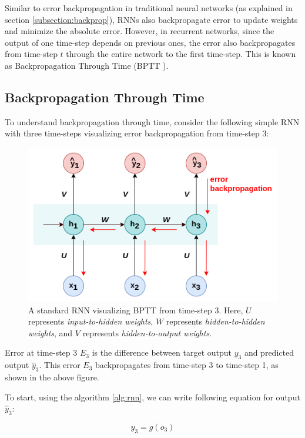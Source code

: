 Similar to error backpropagation in traditional neural networks (as explained in section \ref{subsection:backprop}), RNNs also backpropagate error to update weights and minimize the absolute error. However, in recurrent networks, since the output of one time-step depends on previous ones, the error also backpropagates from time-step $t$ through the entire network to the first time-step. This is known as Backpropagation Through Time (BPTT \cite{bptt-1}).

\subsection{Backpropagation Through Time}\label{subsection:bptt}

To understand backpropagation through time, consider the following simple RNN with three time-steps visualizing error backpropagation from time-step 3:

\begin{figure}[h]
    \centering
    \includegraphics[width=0.7\linewidth]{images/background/bptt.png}
    \caption[Backpropagation Through Time]{A standard RNN visualizing BPTT from time-step 3. Here, $U$ represents \textit{input-to-hidden weights}, $W$ represents \textit{hidden-to-hidden weights}, and $V$ represents \textit{hidden-to-output weights}.}
    \label{fig:bptt}
\end{figure}

Error at time-step 3 $E_3$ is the difference between target output $y_3$  and predicted output $\hat{y}_3$. This error $E_3$ backpropagates from time-step 3 to time-step 1, as shown in the above figure. 

To start, using the algorithm \ref{alg:rnn}, we can write following equation for output $\hat{y}_3$:

\begin{equation}
    \hat{y}_3 = g(o_3)
\end{equation}

